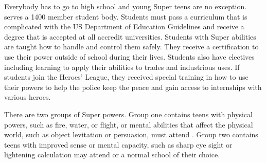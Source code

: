 \documentclass[blue]{LRSguildcamp1}
\begin{document}
\name{\bTest{}}

Everybody has to go to high school and young Super teens are no exception. \pSuperSchool{} serves a 1400 member student body. Students must pass a curriculum that is complicated with the US Department of Education Guidelines and receive a degree that is accepted at all accredit universities. Students with Super abilities are taught how to handle and control them safely. They receive a certification to use their power outside of school during their lives. Students also have electives including learning to apply their abilities to trades and industrious uses.  If students join the Heroes' League, they received special training in how to use their powers to help the police keep the peace and gain access to internships with various heroes. 

There are two groups of Super powers. Group one contains teens with physical powers, such as fire, water, or flight, or mental abilities that affect the physical world, such as object levitation or persuasion, must attend \pSuperShool{}. Group two contains teens with improved sense or mental capacity, such as sharp eye sight or lightening calculation may attend \pSuperSchool{} or a normal school of their choice.  
\end{document}
